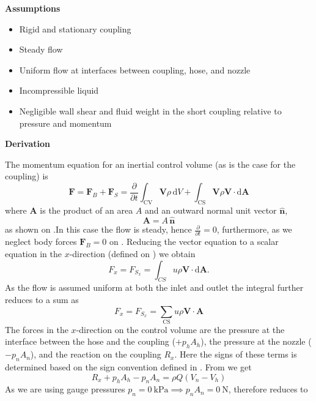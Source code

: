 \documentclass[a4paper]{article}
\renewcommand{\Vec}[1]{\boldsymbol{#1}}
\let\oldhat\hat
\renewcommand{\hat}[1]{\oldhat{\mathbf{#1}}}
\numberwithin{equation}{problem}
\newcommand{\AUheading}[1]{%
  \par\vspace{.4\baselineskip}%
  {\sffamily\bfseries\color{AUblueDark}#1\par}%
  \nobreak%
}
\newenvironment{assumptions}[1][Assumptions]{%
  \AUheading{#1}
  \begin{itemize}[leftmargin=*,nosep]
}{\end{itemize}\par\medskip}
\newenvironment{derivation}[1][Derivation]{%
  \AUheading{#1}
  \begingroup\allowdisplaybreaks
  \setlength{\abovedisplayskip}{6pt}%
  \setlength{\belowdisplayskip}{6pt}%
  \setlength{\abovedisplayshortskip}{4pt}%
  \setlength{\belowdisplayshortskip}{4pt}%
}{\par\endgroup\medskip}
\begin{document}
\begin{assumptions}
  \item Rigid and stationary coupling
  \item Steady flow
  \item Uniform flow at interfaces between coupling, hose, and nozzle
  \item Incompressible liquid
  \item Negligible wall shear and fluid weight in the short coupling relative to pressure and momentum
\end{assumptions}

\begin{derivation}
The momentum equation for an inertial control volume (as is the case for the coupling) is
\begin{equation} \label{eq:mominvec}
\Vec{F} = \Vec{F}_B + \Vec{F}_S = \frac{\partial }{\partial t} \int_{\mathrm{CV}} \Vec{V} \rho \, \mathrm{d}V + \int_{\mathrm{CS}} \Vec{V}\rho \Vec{V} \cdot \mathrm{d}\Vec{A}  
\end{equation}
where $\Vec{A}$ is the product of an area $A$ and an outward normal unit vector $\hat{n}$,
\begin{equation}\label{eq:sgncon}
  \Vec{A} = A \, \hat{n}
\end{equation}
as shown on .In this case the flow is steady, hence $\frac{\partial }{\partial t} = 0$, furthermore, as we neglect body forces $\Vec{F}_B = 0$ on .
Reducing the vector equation to a scalar equation in the $x$-direction (defined on ) we obtain
\[ 
F_x = F_{S_x} = \int_{CS} u \rho \Vec{V} \cdot \mathrm{d}\Vec{A}
.\]
As the flow is assumed uniform at both the inlet and outlet the integral further reduces to a sum as
\begin{equation}\label{eq:momste1d}
  F_x = F_{S_x} = \sum_{\mathrm{CS}} u \rho \Vec{V} \cdot \Vec{A}
\end{equation}
The forces in the $x$-direction on the control volume are the pressure at the interface between the hose and the coupling ($+p_h A_h$), the pressure at the nozzle ($-p_n A_n$), and the reaction on the coupling $R_x$.
Here the signs of these terms is determined based on the sign convention defined in .
From  we get
\begin{equation} \label{eq:momste1dsub}
  R_x + p_h A_h - p_n A_n = \rho Q \left( V_n - V_h \right)
\end{equation}
As we are using gauge pressures $p_n = \qty{0}{\kilo\pascal} \implies p_n A_n = \qty{0}{\newton}$, therefore  reduces to

\end{derivation}
\end{document}
